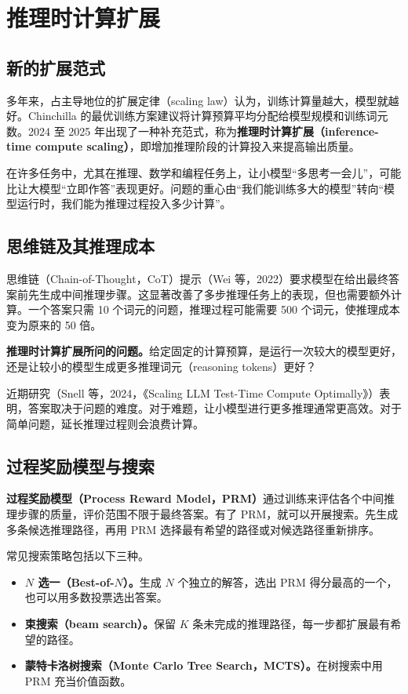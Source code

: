 
\chapter{推理时计算扩展}

\section{新的扩展范式}

多年来，占主导地位的扩展定律（scaling law）认为，训练计算量越大，模型就越好。Chinchilla 的最优训练方案建议将计算预算平均分配给模型规模和训练词元数。2024 至 2025 年出现了一种补充范式，称为\textbf{推理时计算扩展（inference-time compute scaling）}，即增加推理阶段的计算投入来提高输出质量。

在许多任务中，尤其在推理、数学和编程任务上，让小模型“多思考一会儿”，可能比让大模型“立即作答”表现更好。问题的重心由“我们能训练多大的模型”转向“模型运行时，我们能为推理过程投入多少计算”。

\section{思维链及其推理成本}

思维链（Chain-of-Thought，CoT）提示（Wei 等，2022）要求模型在给出最终答案前先生成中间推理步骤。这显著改善了多步推理任务上的表现，但也需要额外计算。一个答案只需 10 个词元的问题，推理过程可能需要 500 个词元，使推理成本变为原来的 50 倍。

\textbf{推理时计算扩展所问的问题。}给定固定的计算预算，是运行一次较大的模型更好，还是让较小的模型生成更多推理词元（reasoning tokens）更好？

近期研究（Snell 等，2024，《Scaling LLM Test-Time Compute Optimally》）表明，答案取决于问题的难度。对于难题，让小模型进行更多推理通常更高效。对于简单问题，延长推理过程则会浪费计算。

\section{过程奖励模型与搜索}

\textbf{过程奖励模型（Process Reward Model，PRM）}通过训练来评估各个中间推理步骤的质量，评价范围不限于最终答案。有了 PRM，就可以开展搜索。先生成多条候选推理路径，再用 PRM 选择最有希望的路径或对候选路径重新排序。

常见搜索策略包括以下三种。

\begin{itemize}
  \item \textbf{\(N\) 选一（Best-of-\(N\)）。}生成 \(N\) 个独立的解答，选出 PRM 得分最高的一个，也可以用多数投票选出答案。
  \item \textbf{束搜索（beam search）。}保留 \(K\) 条未完成的推理路径，每一步都扩展最有希望的路径。
  \item \textbf{蒙特卡洛树搜索（Monte Carlo Tree Search，MCTS）。}在树搜索中用 PRM 充当价值函数。
\end{itemize}

